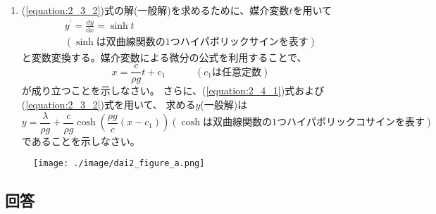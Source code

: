 \begin{enumerate}
  \item (\ref{equation:2_3_2})式の解(一般解)を求めるために、媒介変数\(t\)を用いて
  \begin{gather} \label{equation:2_4_1}
    y^{\prime} = \frac{\mathrm{d}y}{\mathrm{d}x} = \sinh t \\ \nonumber
    \left(\sinh は双曲線関数の1つハイパボリックサインを表す\right) \nonumber
  \end{gather}
  と変数変換する。媒介変数による微分の公式を利用することで、
  \begin{equation} \label{equation:2_4_2}
    x = \frac{c}{\rho g} t + c_{1}
    \qquad\quad(c_{1}は任意定数)
  \end{equation}
  が成り立つことを示しなさい。
  さらに、(\ref{equation:2_4_1})式および(\ref{equation:2_3_2})式を用いて、
  求める\(y\)(一般解)は
  \begin{equation} \label{equation:2_4_3}
    y = \frac{\lambda}{\rho g} + \frac{c}{\rho g} \cosh \left(\frac{\rho g}{c} \left(x - c_{1}\right)\right)
    \left(\cosh は双曲線関数の1つハイパボリックコサインを表す\right)
  \end{equation}
  であることを示しなさい。
\end{enumerate}

\begin{figure}[htbp]
  \centering
  \texttt{[image: ./image/dai2\_figure\_a.png]}
  \caption{}
  \label{figure:2_1}
\end{figure}

\subsection{回答}

